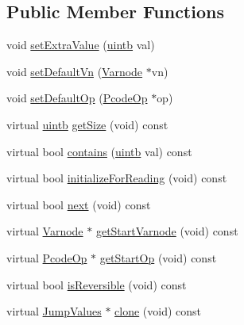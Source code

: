 \subsection*{Public Member Functions}
\begin{DoxyCompactItemize}
\item 
void \mbox{\hyperlink{class_jump_values_range_default_a69eef7fc97a9eae6d943e12c025bb714}{set\+Extra\+Value}} (\mbox{\hyperlink{types_8h_a2db313c5d32a12b01d26ac9b3bca178f}{uintb}} val)
\item 
void \mbox{\hyperlink{class_jump_values_range_default_a894c549442dbcc411f8ffe1fb89eb7c9}{set\+Default\+Vn}} (\mbox{\hyperlink{class_varnode}{Varnode}} $\ast$vn)
\item 
void \mbox{\hyperlink{class_jump_values_range_default_ac55d86f4a33284589ff52333c69c9980}{set\+Default\+Op}} (\mbox{\hyperlink{class_pcode_op}{Pcode\+Op}} $\ast$op)
\item 
virtual \mbox{\hyperlink{types_8h_a2db313c5d32a12b01d26ac9b3bca178f}{uintb}} \mbox{\hyperlink{class_jump_values_range_default_a079bd26853aa52ccac577fd39c1a3e3e}{get\+Size}} (void) const
\item 
virtual bool \mbox{\hyperlink{class_jump_values_range_default_a6f7f9429f60a706f419d4c834fdf4943}{contains}} (\mbox{\hyperlink{types_8h_a2db313c5d32a12b01d26ac9b3bca178f}{uintb}} val) const
\item 
virtual bool \mbox{\hyperlink{class_jump_values_range_default_aa179eae73d98e8ce8f7fee639ef078ae}{initialize\+For\+Reading}} (void) const
\item 
virtual bool \mbox{\hyperlink{class_jump_values_range_default_a1edd06eae7c959fc1b48865fe1bf342d}{next}} (void) const
\item 
virtual \mbox{\hyperlink{class_varnode}{Varnode}} $\ast$ \mbox{\hyperlink{class_jump_values_range_default_a65b5aaf23fe237b5feb699050f75da54}{get\+Start\+Varnode}} (void) const
\item 
virtual \mbox{\hyperlink{class_pcode_op}{Pcode\+Op}} $\ast$ \mbox{\hyperlink{class_jump_values_range_default_a57e9f0efc13c6864527cc0b1aa2017a7}{get\+Start\+Op}} (void) const
\item 
virtual bool \mbox{\hyperlink{class_jump_values_range_default_ae8a65769bf7dbc7f257725c4cf755aa9}{is\+Reversible}} (void) const
\item 
virtual \mbox{\hyperlink{class_jump_values}{Jump\+Values}} $\ast$ \mbox{\hyperlink{class_jump_values_range_default_ac0169c2a1146293eac5fc316411398ba}{clone}} (void) const
\end{DoxyCompactItemize}
